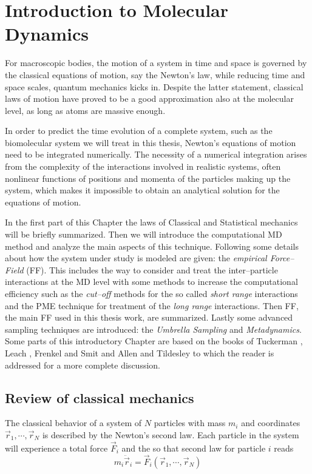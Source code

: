 \chapter{Introduction to Molecular Dynamics}
For macroscopic bodies, the motion of a system in time and space is governed by the classical equations of motion, say the Newton’s law, while reducing time and space scales, quantum mechanics kicks in. Despite the latter statement, classical laws of motion have proved to be a good approximation also at the molecular level, as long as atoms are massive enough.

In order to predict the time evolution of a complete system, such as the biomolecular system we will treat in this thesis, Newton’s equations of motion need to be integrated numerically. The necessity of a numerical integration arises from the complexity of the interactions involved in realistic systems, often nonlinear functions of positions and momenta of the particles making up the system, which makes it impossible to obtain an analytical solution for the equations of motion.

In the first part of this Chapter the laws of Classical and Statistical mechanics will be briefly summarized.
Then we will introduce the computational \acf{MD} method and analyze the main aspects of this technique.
Following some details about how the system under study is modeled are given: the \textit{empirical Force--Field} (\acs{FF}). This includes the way to consider and treat the inter--particle interactions at the \ac{MD} level with some methods to increase the computational efficiency such as the \textit{cut--off} methods for the so called \textit{short range} interactions and the \ac{PME} technique for treatment of the \textit{long range} interactions.
Then \martini \ac{FF}, the main \ac{FF} used in this thesis work, are summarized. Lastly some advanced sampling techniques are introduced: the \textit{Umbrella Sampling} and \textit{Metadynamics}. Some parts of this introductory Chapter are based on the books of Tuckerman \cite{Tuckerman}, Leach \cite{Leach}, Frenkel and Smit \cite{Frenkel} and Allen and Tildesley \cite{Allen} to which the reader is addressed for a more complete discussion.

\section{Review of classical mechanics}
The classical behavior of a system of $N$ particles with mass $m_i$ and coordinates $\vec r_1,\cdots,\vec r_N$ is described by the Newton's second law. Each particle in the system will experience a total force $\vec F_i$ and the so that second law for particle $i$ reads
\begin{equation}
	m_i \ddot{\vec{r}}_i = \vec F_i(\vec r_1,\cdots,\vec r_N)
	\label{eq:newtonLaw}
\end{equation}

